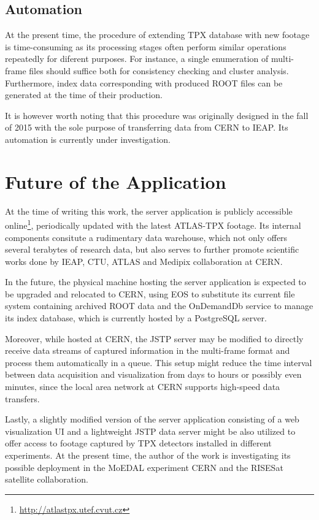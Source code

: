 \subsection{Automation}
At the present time, the procedure of extending TPX database with new footage is time-consuming as its processing stages often perform similar operations repeatedly for diferent purposes. For instance, a single enumeration of multi-frame files should suffice both for consistency checking and cluster analysis. Furthermore, index data corresponding with produced ROOT files can be generated at the time of their production.

It is however worth noting that this procedure was originally designed in the fall of 2015 with the sole purpose of transferring data from CERN to IEAP. Its automation is currently under investigation.

\section{Future of the Application}
At the time of writing this work, the server application is publicly accessible online\footnote{\url{http://atlastpx.utef.cvut.cz}}, periodically updated with the latest ATLAS-TPX footage. Its internal components consitute a rudimentary data warehouse, which not only offers several terabytes of research data, but also serves to further promote scientific works done by IEAP, CTU, ATLAS and Medipix collaboration at CERN.

In the future, the physical machine hosting the server application is expected to be upgraded and relocated to CERN, using EOS to substitute its current file system containing archived ROOT data and the OnDemandDb service to manage its index database, which is currently hosted by a PostgreSQL server.

Moreover, while hosted at CERN, the JSTP server may be modified to directly receive data streams of captured information in the multi-frame format and process them automatically in a queue. This setup might reduce the time interval between data acquisition and visualization from days to hours or possibly even minutes, since the local area network at CERN supports high-speed data transfers.

Lastly, a slightly modified version of the server application consisting of a web visualization UI and a lightweight JSTP data server might be also utilized to offer access to footage captured by TPX detectors installed in different experiments. At the present time, the author of the work is investigating its possible deployment in the MoEDAL experiment CERN and the RISESat satellite collaboration.

